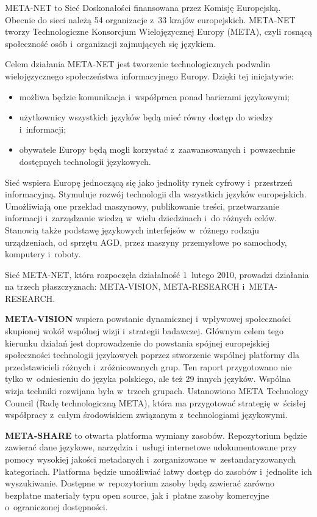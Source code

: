 \begin{multicols}{2} 

META-NET to Sieć Doskonałości finansowana przez Komisję
Europejską. Obecnie do sieci należą 54 organizacje z~33 krajów
europejskich. META-NET tworzy Technologiczne Konsorcjum
Wielojęzycznej Europy (META), czyli rosnącą społeczność osób
i~organizacji zajmujących się językiem. 

Celem działania META-NET jest tworzenie technologicznych podwalin
wielojęzycznego społeczeństwa informacyjnego Europy. Dzięki tej
inicjatywie: 

\begin{itemize} \item możliwa będzie komunikacja i~współpraca
ponad barierami językowymi; \item użytkownicy wszystkich języków
będą mieć równy dostęp do wiedzy i~informacji; \item obywatele
Europy będą mogli korzystać z~zaawansowanych i~powszechnie
dostępnych technologii językowych. \end{itemize} 

Sieć wspiera Europę jednoczącą się jako jednolity rynek cyfrowy
i~przestrzeń informacyjną. Stymuluje rozwój technologii dla
wszystkich języków europejskich. Umożliwiają one przekład
maszynowy, publikowanie treści, przetwarzanie informacji
i~zarządzanie wiedzą w~wielu dziedzinach i~do różnych celów.
Stanowią także podstawę językowych interfejsów w~różnego
rodzaju urządzeniach, od sprzętu AGD, przez maszyny przemysłowe po
samochody, komputery i~roboty. 

Sieć META-NET, która rozpoczęła działalność 1~lutego 2010,
prowadzi działania na trzech płaszczyznach: META-VISION,
META-RESEARCH i~META-RESEARCH. 

\textbf{META-VISION} wspiera powstanie dynamicznej i~wpływowej
społeczności skupionej wokół wspólnej wizji i~strategii
badawczej. Głównym celem tego kierunku działań jest doprowadzenie
do powstania spójnej europejskiej społeczności technologii
językowych poprzez stworzenie wspólnej platformy dla przedstawicieli
różnych i~zróżnicowanych grup. Ten raport przygotowano nie tylko
w~odniesieniu do języka polskiego, ale też 29 innych języków.
Wspólna wizja techniki rozwijana była w~trzech grupach. Ustanowiono
META Technology Council (Radę technologiczną META), która ma
przygotować strategię w~ścisłej współpracy z~całym
środowiskiem związanym z~technologiami językowymi. 

\textbf{META-SHARE} to otwarta platforma wymiany zasobów.
Repozytorium będzie zawierać dane językowe, narzędzia i~usługi
internetowe udokumentowane przy pomocy wysokiej jakości metadanych
i~zorganizowane w~zestandaryzowanych kategoriach. Platforma będzie
umożliwiać łatwy dostęp do zasobów i~jednolite ich wyszukiwanie.
Dostępne w~repozytorium zasoby będą zawierać zarówno bezpłatne
materiały typu open source, jak i~płatne zasoby komercyjne
o~ograniczonej dostępności. 


\end{multicols}
